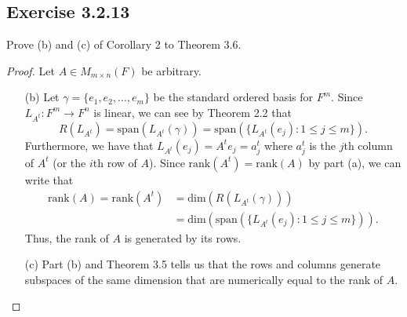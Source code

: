 \subsection*{Exercise 3.2.13} Prove (b) and (c) of Corollary 2 to Theorem 3.6.
\begin{proof}
    Let \( A \in {M}_{m \times n}(F) \) be arbitrary.
    \begin{enumerate}
        \item[(b)] Let \( \gamma = \{ {e}_{1}, {e}_{2}, \dots, {e}_{m} \}  \) be the standard ordered basis for \( F^{m} \). Since \( {L}_{A^{t}}: F^{m} \to F^{n} \) is linear, we can see by Theorem 2.2 that
            \[ R({L}_{A^{t}}) = \text{span}({L}_{A^{t}}(\gamma)) = \text{span}( \{ {L}_{A^{t}}({e}_{j}): 1 \leq j \leq m  \} ).   \]
            Furthermore, we have that \( {L}_{A^{t}}({e}_{j}) = A^{t} {e}_{j} = a^{t}_{j} \) where \( a^{t}_j \) is the \( j \)th column of \( A^{t} \) (or the \( i \)th row of \( A \)). Since \( \text{rank}(A^{t}) = \text{rank}(A)  \) by part (a), we can write that
            \begin{align*}
                \text{rank}(A) = \text{rank}(A^{t}) &= \text{dim}(R({L}_{A^{t}}(\gamma))) \\
                                                    &= \text{dim}(\text{span}(\{ {L}_{A^{t}}({e}_{j}) : 1 \leq j \leq m  \} )).
            \end{align*}
            Thus, the rank of \( A  \) is generated by its rows.
        \item[(c)] Part (b) and Theorem 3.5 tells us that the rows and columns generate subspaces of the same dimension that are numerically equal to the rank of \( A  \).
    \end{enumerate}
\end{proof}


